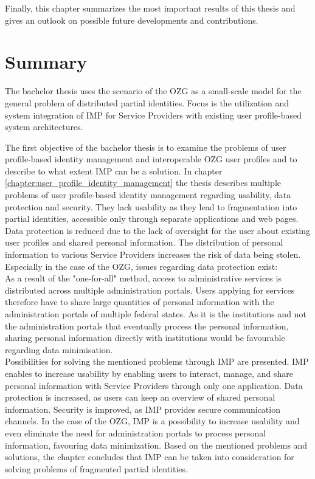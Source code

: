Finally, this chapter summarizes the most important results of this thesis and gives an outlook on possible future developments and contributions.

\section{Summary}

The bachelor thesis uses the scenario of the OZG as a small-scale model for the general problem of distributed partial identities. Focus is the utilization and system integration of IMP for Service Providers with existing user profile-based system architectures.

The first objective of the bachelor thesis is to examine the problems of user profile-based identity management and interoperable OZG user profiles and to describe to what extent IMP can be a solution. In chapter \ref{chapter:user_profile_identity_management} the thesis describes multiple problems of user profile-based identity management regarding usability, data protection and security. They lack usability as they lead to fragmentation into partial identities, accessible only through separate applications and web pages. Data protection is reduced due to the lack of oversight for the user about existing user profiles and shared personal information. The distribution of personal information to various Service Providers increases the risk of data being stolen. Especially in the case of the OZG, issues regarding data protection exist: \\
As a result of the "one-for-all" method, access to administrative services is distributed across multiple administration portals. Users applying for services therefore have to share large quantities of personal information with the administration portals of multiple federal states. As it is the institutions and not the administration portals that eventually process the personal information, sharing personal information directly with institutions would be favourable regarding data minimisation. \\
Possibilities for solving the mentioned problems through IMP are presented. IMP enables to increase usability by enabling users to interact, manage, and share personal information with Service Providers through only one application. Data protection is increased, as users can keep an overview of shared personal information. Security is improved, as IMP provides secure communication channels. In the case of the OZG, IMP is a possibility to increase usability and even eliminate the need for administration portals to process personal information, favouring data minimization. Based on the mentioned problems and solutions, the chapter concludes that IMP can be taken into consideration for solving problems of fragmented partial identities.

